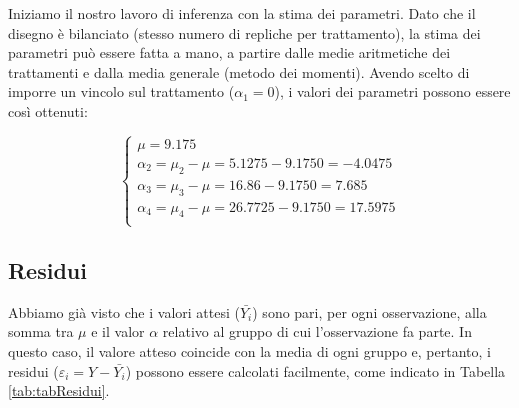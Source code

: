 \documentclass[a4paper,12pt,oneside]{book}
\begin{document}
Iniziamo il nostro lavoro di inferenza con la stima dei parametri. Dato che il disegno è bilanciato (stesso numero di repliche per trattamento), la stima dei parametri può essere fatta a mano, a partire dalle medie aritmetiche dei trattamenti e dalla media generale (metodo dei momenti). Avendo scelto di imporre un vincolo sul trattamento (\(\alpha_1 = 0\)), i valori dei parametri possono essere così ottenuti:

\[ \left\{ {\begin{array}{l}
\mu = 9.175\\
\alpha_2 = \mu_2 - \mu = 5.1275 - 9.1750 =  - 4.0475\\
\alpha_3 = \mu_3 - \mu = 16.86 - 9.1750 =  7.685\\
\alpha_4 = \mu_4 - \mu = 26.7725 - 9.1750 =  17.5975\\
\end{array}} \right.\]

\hypertarget{residui}{%
\subsection{Residui}\label{residui}}

Abbiamo già visto che i valori attesi (\(\bar{Y_i}\)) sono pari, per ogni osservazione, alla somma tra \(\mu\) e il valor \(\alpha\) relativo al gruppo di cui l'osservazione fa parte. In questo caso, il valore atteso coincide con la media di ogni gruppo e, pertanto, i residui (\(\varepsilon_i = Y - \bar{Y_i}\)) possono essere calcolati facilmente, come indicato in Tabella \ref{tab:tabResidui}.
\end{document}
